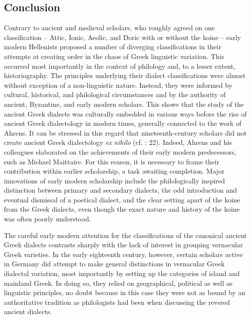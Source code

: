 \subsection{Conclusion}
\hypertarget{Toc19704817}{}
Contrary to ancient and medieval scholars, who roughly agreed on one classification – Attic, Ionic, Aeolic, and Doric with or without the koine – early modern Hellenists proposed a number of diverging classifications in their attempts at creating order in the chaos of Greek linguistic variation. This occurred most importantly in the context of philology and, to a lesser extent, historiography. The principles underlying their dialect classifications were almost without exception of a non-linguistic nature. Instead, they were informed by cultural, historical, and philological circumstances and by the authority of ancient, Byzantine, and early modern scholars. This shows that the study of the ancient Greek dialects was culturally embedded in various ways before the rise of ancient Greek dialectology in modern times, generally connected to the work of Ahrens. It can be stressed in this regard that nineteenth-century scholars did not create ancient Greek dialectology \textit{ex} \textit{nihilo} (cf. \citealt{Colvin2007}: 22). Indeed, Ahrens and his colleagues elaborated on the achievements of their early modern predecessors, such as Michael Maittaire. For this reason, it is necessary to frame their contribution within earlier scholarship, a task awaiting completion. Major innovations of early modern scholarship include the philologically inspired distinction between primary and secondary dialects, the odd introduction and eventual dismissal of a poetical dialect, and the clear setting apart of the koine from the Greek dialects, even though the exact nature and history of the koine was often poorly understood.

The careful early modern attention for the classifications of the canonical ancient Greek dialects contrasts sharply with the lack of interest in grouping vernacular Greek varieties. In the early eighteenth century, however, certain scholars active in Germany did attempt to make general distinctions in vernacular Greek dialectal variation, most importantly by setting up the categories of island and mainland Greek. In doing so, they relied on geographical, political as well as linguistic principles, no doubt because in this case they were not as bound by an authoritative tradition as philologists had been when discussing the revered ancient dialects.

